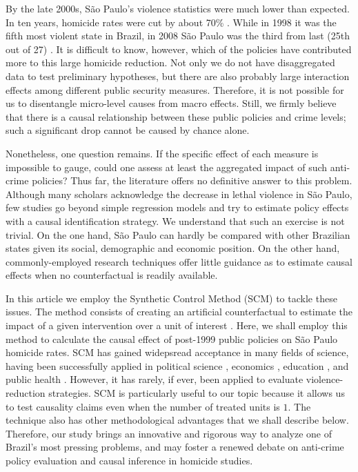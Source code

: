 \documentclass[a4paper,11pt]{article}
\begin{document}
By the late 2000s, S\~{a}o Paulo's violence statistics were much lower than expected. In ten years, homicide rates were cut by about 70\% \citep{feltran2012}. While in 1998 it was the fifth most violent state in Brazil, in 2008 S\~{a}o Paulo was the third from last (25th out of 27) \citep{mapa2011}. It is difficult to know, however, which of the policies have contributed more to this large homicide reduction. Not only we do not have disaggregated data to test preliminary hypotheses, but there are also probably large interaction effects among different public security measures. Therefore, it is not possible for us to disentangle micro-level causes from macro effects. Still, we firmly believe that there is a causal relationship between these public policies and crime levels; such a significant drop cannot be caused by chance alone. 

Nonetheless, one question remains. If the specific effect of each measure is impossible to gauge, could one assess at least the aggregated impact of such anti-crime policies? Thus far, the literature offers no definitive answer to this problem. Although many scholars acknowledge the decrease in lethal violence in S\~{a}o Paulo, few studies go beyond simple regression models and try to estimate policy effects with a causal identification strategy. We understand that such an exercise is not trivial. On the one hand, S\~{a}o Paulo can hardly be compared with other Brazilian states given its social, demographic and economic position. On the other hand, commonly-employed research techniques offer little guidance as to estimate causal effects when no counterfactual is readily available. 

In this article we employ the Synthetic Control Method (SCM) to tackle these issues. The method consists of creating an artificial counterfactual to estimate the impact of a given intervention over a unit of interest \citep{abadie2003, abadie2010, abadie2011}. Here, we shall employ this method to calculate the causal effect of post-1999 public policies on S\~{a}o Paulo homicide rates. SCM has gained widepsread acceptance in many fields of science, having been successfully applied in political science \citep{abadie2014, montalvo2011}, economics \citep{billmeier2013, coffman2012, jinjarak2013}, education \citep{hinrichs2012}, and public health \citep{heim2014}. However, it has rarely, if ever, been applied to evaluate violence-reduction strategies. SCM is particularly useful to our topic because it allows us to test causality claims even when the number of treated units is $1$. The technique also has other methodological advantages that we shall describe below. Therefore, our study brings an innovative and rigorous way to analyze one of Brazil's most pressing problems, and may foster a renewed debate on anti-crime policy evaluation and causal inference in homicide studies.
\end{document}

